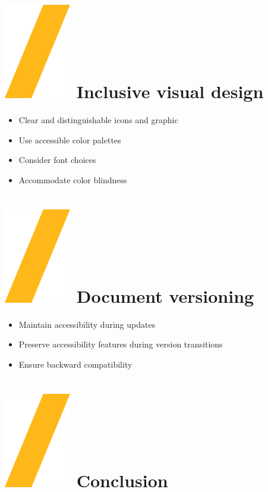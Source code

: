 \documentclass[a0paper,fleqn]{src/betterposter}
\begin{document}
{}{

\section{\includegraphics[height=\fontcharht\font`\S]{img/general/slash.png} Inclusive visual design}

\begin{itemize}
\item Clear and distinguishable icons and graphic
\item Use accessible color palettes
\item Consider font choices
\item Accommodate color blindness
\end{itemize}

\section{\includegraphics[height=\fontcharht\font`\S]{img/general/slash.png} Document versioning}

\begin{itemize}
\item Maintain accessibility during updates
\item Preserve accessibility features during version transitions
\item Ensure backward compatibility
\end{itemize}

\section{\includegraphics[height=\fontcharht\font`\S]{img/general/slash.png} Conclusion}

}
\end{document}
